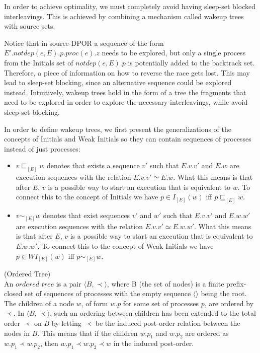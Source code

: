 In order to achieve optimality, we must completely avoid having sleep-set blocked interleavings. This is achieved by
combining a mechanism called wakeup trees \cite{AbdullaAronisJohnssonSagonasDPOR2014} with source sets.

Notice that in source-DPOR a sequence of the form $E'.notdep(e,E).p.proc(e).z$ needs to be explored, but only
a single process from the Initials set of $notdep(e,E).p$ is potentially added to the backtrack set.
Therefore, a piece 
of information on how to reverse the race gets lost. This may lead to sleep-set blocking, since an alternative sequence could be explored 
instead. Intuitively, wakeup trees hold in the form of a tree the fragments that need to be explored in order
to explore the necessary interleavings, while avoid sleep-set blocking.

In order to define wakeup trees, we first present the generalizations of 
the concepts of Initials and Weak Initials so they can contain sequences of processes instead of just processes:

\begin{itemize}
    \item $v \sqsubseteq_{[E]} w $ denotes that exists a sequence $v'$ such that $E.v.v'$ and $E.w$ are execution
    sequences with the relation $E.v.v' \simeq E.w$. What this means is that after $E$, $v$ is a possible
    way to start an execution that is equivalent to $w$. To connect this to the concept of Initials we have
    $p \in I_{[E]}(w)$ iff $p \sqsubseteq_{[E]} w $.
    \item $v \sim_{[E]} w $ denotes that exist sequences $v'$ and $w'$ such
    that $E.v.v'$ and $E.w.w'$ are execution sequences with the relation $E.v.v' \simeq E.w.w'$.
    What this means is that after $E$, $v$ is a possible way to start an execution that is equivalent to $E.w.w'$.
    To connect this to the concept of Weak Initials we have $p \in WI_{[E]}(w)$ iff $p \sim_{[E]} w $.
\end{itemize}

\begin{definition}{(Ordered Tree)}\label{def:Ordered}\\
An $ordered$ $tree$ is a pair $\langle B , \prec \rangle$, where B (the set of nodes) is a finite prefix-closed
    set of sequences of processes with the empty sequence $\langle\rangle$ being the root.
    The children of a node $w$, of form $w.p$ for some set of processes $p$, are ordered by $\prec$. 
    In $\langle B , \prec \rangle$, such an ordering between children has been extended to the total 
    order $\prec$ on $B$ by letting $\prec$ be the induced post-order relation between the nodes in $B$.
    This means that if the children $w.p_1$ and $w.p_2$ are ordered as $w.p_1 \prec w.p_2$,
    then $w.p_1 \prec w.p_2 \prec w $ in the induced post-order.
\end{definition}

